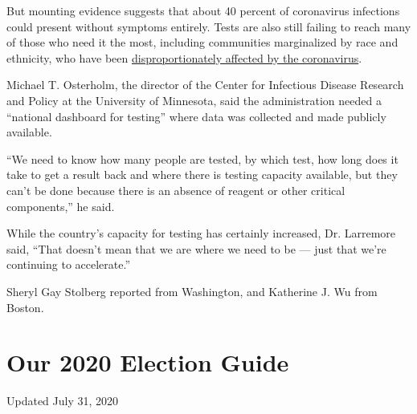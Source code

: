 But mounting evidence suggests that about 40 percent of coronavirus
infections could present without symptoms entirely. Tests are also still
failing to reach many of those who need it the most, including
communities marginalized by race and ethnicity, who have been
\href{https://www.nytimes.com/interactive/2020/07/05/us/coronavirus-latinos-african-americans-cdc-data.html}{disproportionately
affected by the coronavirus}.

Michael T. Osterholm, the director of the Center for Infectious Disease
Research and Policy at the University of Minnesota, said the
administration needed a ``national dashboard for testing'' where data
was collected and made publicly available.

``We need to know how many people are tested, by which test, how long
does it take to get a result back and where there is testing capacity
available, but they can't be done because there is an absence of reagent
or other critical components,'' he said.

While the country's capacity for testing has certainly increased, Dr.
Larremore said, ``That doesn't mean that we are where we need to be ---
just that we're continuing to accelerate.''

Sheryl Gay Stolberg reported from Washington, and Katherine J. Wu from
Boston.

\hypertarget{our-2020-election-guide}{%
\section{Our 2020 Election Guide}\label{our-2020-election-guide}}

Updated July 31, 2020


